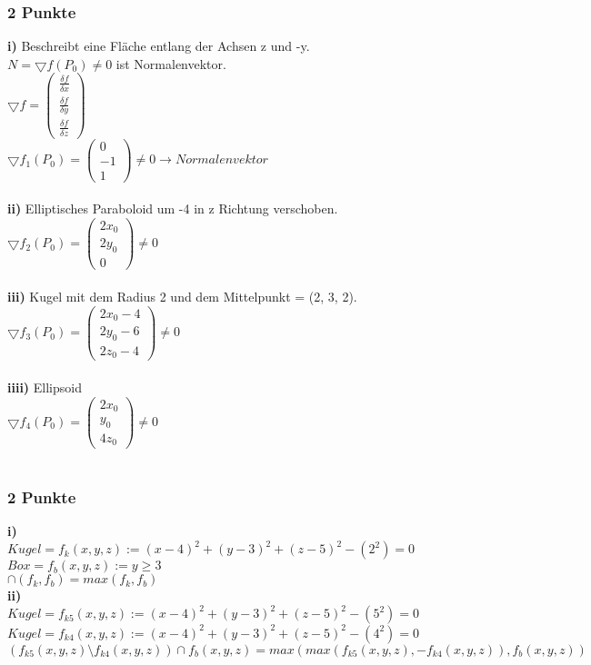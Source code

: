 \subsubsection{2 Punkte}
\textbf{i)} Beschreibt eine Fläche entlang der Achsen z und -y.\\
$N = \bigtriangledown f(P_0) \neq 0$ ist Normalenvektor. \\
$\bigtriangledown f = \begin{pmatrix} \frac{\delta f}{\delta x} \\ \frac{\delta f}{\delta y} \\ \frac{\delta f}{\delta z}\end{pmatrix}$ \\
$\bigtriangledown f_1(P_0) = \begin{pmatrix} 0 \\ -1 \\ 1\end{pmatrix} \neq 0 \rightarrow Normalenvektor$ \\ \\
\textbf{ii)} Elliptisches Paraboloid um -4 in z Richtung verschoben.\\
$\bigtriangledown f_2(P_0) = \begin{pmatrix} 2x_0 \\ 2y_0 \\ 0\end{pmatrix} \neq 0$ \\ \\
\textbf{iii)} Kugel mit dem Radius 2 und dem Mittelpunkt = (2, 3, 2).\\
$\bigtriangledown f_3(P_0) = \begin{pmatrix} 2x_0-4 \\ 2y_0-6 \\ 2z_0-4\end{pmatrix} \neq 0$ \\ \\
\textbf{iiii)} Ellipsoid\\
$\bigtriangledown f_4(P_0) = \begin{pmatrix} 2x_0 \\ y_0 \\ 4z_0\end{pmatrix} \neq 0$ \\ \\

\subsubsection{2 Punkte}
\textbf{i)} \\
$Kugel = f_k(x,y,z) := (x-4)^2+(y-3)^2+(z-5)^2-(2^2) = 0$ \\
$Box = f_b(x,y,z) := y \geq 3$\\
$\cap(f_k,f_b) = max(f_k,f_b)$ \\
\textbf{ii)} \\
$Kugel = f_{k5}(x,y,z) := (x-4)^2+(y-3)^2+(z-5)^2-(5^2) = 0$ \\
$Kugel = f_{k4}(x,y,z) := (x-4)^2+(y-3)^2+(z-5)^2-(4^2) = 0$ \\
$(f_{k5}(x,y,z)\setminus f_{k4}(x,y,z)) \cap f_b(x,y,z) = max(max(f_{k5}(x,y,z),-f_{k4}(x,y,z)),f_b(x,y,z))$